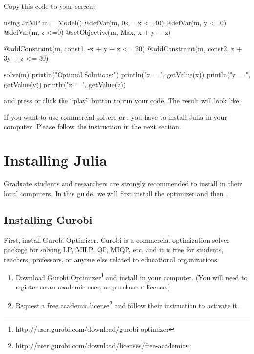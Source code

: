 Copy this code to your screen:
\begin{code}
using JuMP
m = Model()
@defVar(m, 0<= x <=40)
@defVar(m, y <=0)
@defVar(m, z <=0)
@setObjective(m, Max, x + y + z)

@addConstraint(m, const1, -x +  y + z <= 20)
@addConstraint(m, const2,  x + 3y + z <= 30)

solve(m)
println("Optimal Solutions:")
println("x = ", getValue(x))
println("y = ", getValue(y))
println("z = ", getValue(z))
\end{code}
\noindent and press  or click the ``play'' button to run your code. The result will look like:



If you want to use commercial solvers \cplex{} or \gurobi{}, you have to install Julia in your computer. Please follow the instruction in the next section.




\section{Installing Julia}
Graduate students and researchers are strongly recommended to install \julia{} in their local computers. In this guide, we will first install the \gurobi{} optimizer and then \julia{}.

\subsection{Installing Gurobi}

First, install Gurobi Optimizer. Gurobi is a commercial optimization solver package for solving LP, MILP, QP, MIQP, etc, and it is free for students, teachers, professors, or anyone else related to educational organizations.

\begin{enumerate}
\item \href{http://user.gurobi.com/download/gurobi-optimizer}{Download Gurobi Optimizer}\footnote{\url{http://user.gurobi.com/download/gurobi-optimizer}} and install in your computer. (You will need to register as an academic user, or purchase a license.)
\item \href{http://user.gurobi.com/download/licenses/free-academic}{Request a free academic license}\footnote{\url{http://user.gurobi.com/download/licenses/free-academic}} and follow their instruction to activate it.
\end{enumerate}

